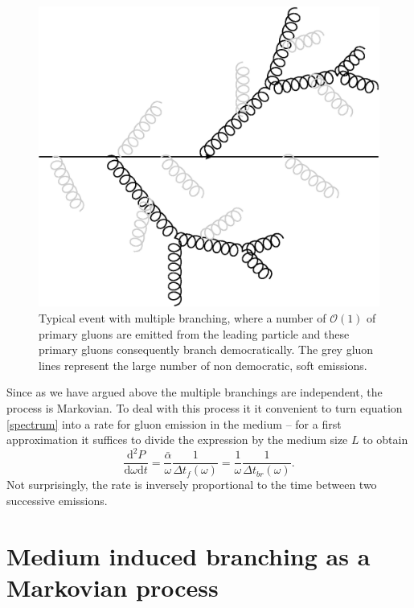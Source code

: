 \documentclass[a4paper,12pt]{article}
\numberwithin{equation}{section}
\begin{document}
\begin{figure}
\begin{center}
\includegraphics[width=0.5\linewidth]{democraticbranch.eps}
\end{center}
\vspace*{-20pt}
\caption{Typical event with multiple branching, where a number of $\mathcal{O}(1)$ of primary gluons are emitted from the leading particle and these primary gluons consequently branch democratically. The grey gluon lines represent the large number of non democratic, soft emissions.}\label{democraticbranch}
\end{figure}



Since as we have argued above the multiple branchings are independent, the process is Markovian. To deal with this process it it convenient to turn equation \eqref{spectrum} into a rate for gluon emission in the medium -- for a first approximation it suffices to divide the expression by the medium size $L$ to obtain
\begin{equation}\label{rate}
\frac{\mathrm{d}^2P}{\mathrm{d}\omega \mathrm{d}t} =\frac{\bar{\alpha}}{\omega}\frac{1}{\Delta t_f(\omega)} = \frac{1}{\omega}\frac{1}{\Delta t_{br}(\omega)}.
\end{equation}
Not surprisingly, the rate is inversely proportional to the time between two successive emissions. 



\section{Medium induced branching as a Markovian process}\label{stochastic}

\end{document}
